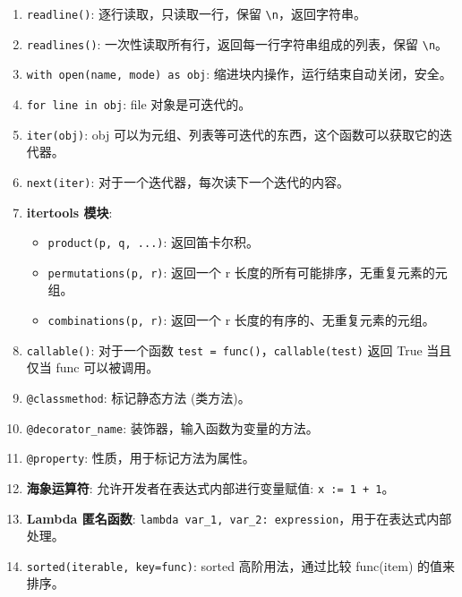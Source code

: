 \documentclass[a4paper, 12pt]{article}
\newcommand{\code}[1]{\texttt{\color{blue!60!black}#1}}
\newcommand{\kw}[1]{\textbf{#1}} %
\newcommand{\threedigits}[1]{%
  \ifnum#1<10 00#1%
  \else\ifnum#1<100 0#1%
  \else #1%
  \fi\fi%
}
\begin{document}
\begin{enumerate}[label=\textbf{\protect\threedigits{\value*}.}, leftmargin=3.5em, itemsep=0.8ex, parsep=0.5ex]
    \item \code{readline()}: 逐行读取，只读取一行，保留 \code{\textbackslash n}，返回字符串。
    
    \item \code{readlines()}: 一次性读取所有行，返回每一行字符串组成的列表，保留 \code{\textbackslash n}。
    
    \item \code{with open(name, mode) as obj}: 缩进块内操作，运行结束自动关闭，安全。
    
    \item \code{for line in obj}: file 对象是可迭代的。
    
    \item \code{iter(obj)}: obj 可以为元组、列表等可迭代的东西，这个函数可以获取它的迭代器。
    
    \item \code{next(iter)}: 对于一个迭代器，每次读下一个迭代的内容。
    
    \item \kw{itertools 模块}:
    \begin{itemize}
        \item \code{product(p, q, ...)}: 返回笛卡尔积。
        \item \code{permutations(p, r)}: 返回一个 r 长度的所有可能排序，无重复元素的元组。
        \item \code{combinations(p, r)}: 返回一个 r 长度的有序的、无重复元素的元组。
    \end{itemize}
    
    \item \code{callable()}: 对于一个函数 \code{test = func()}，\code{callable(test)} 返回 True 当且仅当 func 可以被调用。
    
    \item \code{@classmethod}: 标记静态方法 (类方法)。
    
    \item \code{@decorator\_name}: 装饰器，输入函数为变量的方法。
    
    \item \code{@property}: 性质，用于标记方法为属性。
    
    \item \kw{海象运算符}: 允许开发者在表达式内部进行变量赋值: \code{x := 1 + 1}。
    
    \item \kw{Lambda 匿名函数}: \code{lambda var\_1, var\_2: expression}，用于在表达式内部处理。
    
    \item \code{sorted(iterable, key=func)}: sorted 高阶用法，通过比较 func(item) 的值来排序。
    

\end{enumerate}
\end{document}
